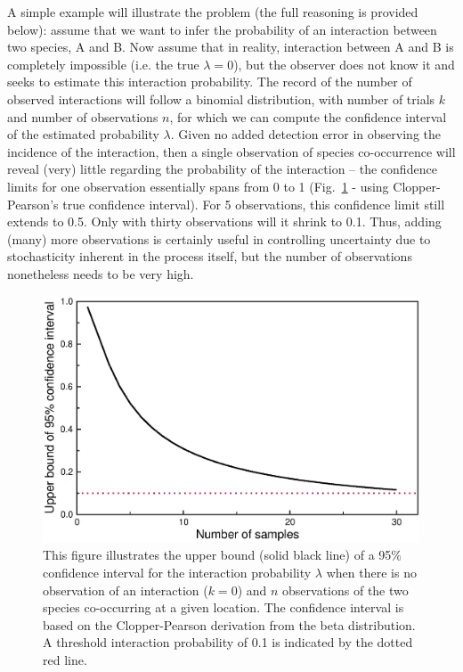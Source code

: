 \documentclass[12pt]{article}
\begin{document}

  A simple example will illustrate the problem (the full reasoning is provided below): assume that we want to infer the probability of an interaction between two species, A and B. Now assume that in reality, interaction between A and B is completely impossible (i.e. the true $\lambda=0$), but the observer does not know it and seeks to estimate this interaction probability. The record of the number of observed interactions will follow a binomial distribution, with number of trials $k$ and number of observations $n$, for which we can compute the confidence interval of the estimated probability $\lambda$. Given no added detection error in observing the incidence of the interaction, then a single observation of species co-occurrence will reveal (very) little regarding the probability of the interaction – the confidence limits for one observation essentially spans from 0 to 1 (Fig.~\ref{upper_limits} - using Clopper-Pearson's true confidence interval). For 5 observations, this confidence limit still extends to 0.5. Only with thirty observations will it shrink to 0.1. Thus, adding (many) more observations is certainly useful in controlling uncertainty due to stochasticity inherent in the process itself, but the number of observations nonetheless needs to be very high. 

  \begin{figure}
    \caption{This figure illustrates the upper bound (solid black line) of a 95\% confidence interval for the interaction probability $\lambda$ when there is no observation of an interaction ($k = 0$) and $n$ observations of the two species co-occurring at a given location. The confidence interval is based on the Clopper-Pearson derivation from the beta distribution. A threshold interaction probability of 0.1 is indicated by the dotted red line.}
    \label{upper_limits}
    \includegraphics*[width=.8\textwidth]{figures/upper_limit_DG.eps}
  \end{figure}
\end{document}
